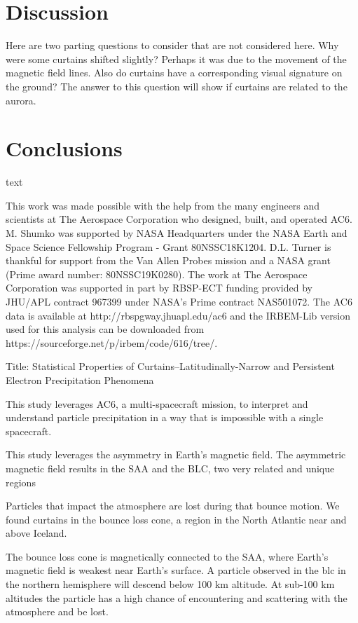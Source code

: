 \documentclass[draft]{agujournal2019}
\begin{document}
\section{Discussion} \label{discussion}
Here are two parting questions to consider that are not considered here. Why were some curtains shifted slightly? Perhaps it was due to the movement of the magnetic field lines. Also do curtains have a corresponding visual signature on the ground? The answer to this question will show if curtains are related to the aurora.

\section{Conclusions}
text


\acknowledgments
This work was made possible with the help from the many engineers and scientists at The Aerospace Corporation who designed, built, and operated AC6. M. Shumko was supported by NASA Headquarters under the NASA Earth and Space Science Fellowship Program - Grant 80NSSC18K1204. D.L. Turner is thankful for support from the Van Allen Probes mission and a NASA grant (Prime award number: 80NSSC19K0280). The work at The Aerospace Corporation was supported in part by RBSP-ECT funding provided by JHU/APL contract 967399 under NASA's Prime contract NAS501072. The AC6 data is available at http://rbspgway.jhuapl.edu/ac6 and the IRBEM-Lib version used for this analysis can be downloaded from https://sourceforge.net/p/irbem/code/616/tree/.

Title: Statistical Properties of Curtains--Latitudinally-Narrow and Persistent Electron Precipitation Phenomena

This study leverages AC6, a multi-spacecraft mission, to interpret and understand particle precipitation in a way that is impossible with a single spacecraft.

This study leverages the asymmetry in Earth's magnetic field. The asymmetric magnetic field results in the SAA and the BLC, two very related and unique regions

Particles that impact the atmosphere are lost during that bounce motion. We found curtains in the bounce loss cone, a region in the North Atlantic near and above Iceland.

The bounce loss cone is magnetically connected to the SAA, where Earth's magnetic field is weakest near Earth's surface. A particle observed in the blc in the northern hemisphere will descend below 100 km altitude. At sub-100 km altitudes the particle has a high chance of encountering and scattering with the atmosphere and be lost. 
\end{document}
